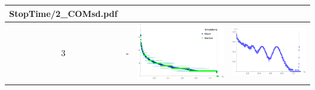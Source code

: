 \begin{table}[!htb]
\begin{tabular}{c|c|c|c}
\begin{minipage}{.4\textwidth}
			{StopTime/2_COMsd.pdf}
		\end{minipage}   
	 \\ \hline
		3 & - &
		\begin{minipage}{.4\textwidth}
			\includegraphics[width=\linewidth]
			{StopTime/3_BMtau.pdf}
		\end{minipage}
		& \begin{minipage}{.4\textwidth}
			\includegraphics[width=\linewidth]
			{StopTime/3_BMsd.pdf}
		\end{minipage}    
	\end{tabular}
\label{tab1}
\end{table}
